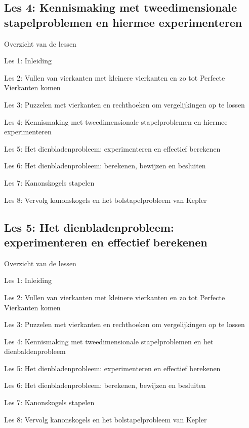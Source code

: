 \documentclass[dutch]{beamer}
\begin{document}
\subsection{Les 4: Kennismaking met tweedimensionale stapelproblemen en hiermee experimenteren}
\begin{frame}
{Overzicht van de lessen}
\begin{list}{\quad}{}
\item Les 1: Inleiding
\item Les 2: Vullen van vierkanten met kleinere vierkanten en zo tot Perfecte Vierkanten komen
\item Les 3: Puzzelen met vierkanten en rechthoeken om vergelijkingen op te lossen
\item {\color{blue}Les 4: Kennismaking met tweedimensionale stapelproblemen en hiermee experimenteren}
\item Les 5: Het dienbladenprobleem: experimenteren en effectief berekenen
\item Les 6: Het dienbladenprobleem: berekenen, bewijzen en besluiten
\item Les 7: Kanonskogels stapelen
\item Les 8: Vervolg kanonskogels en het bolstapelprobleem van Kepler
\end{list}
\end{frame}

\subsection{Les 5: Het dienbladenprobleem: experimenteren en effectief berekenen}
\begin{frame}
{Overzicht van de lessen}
\begin{list}{\quad}{}
\item Les 1: Inleiding
\item Les 2: Vullen van vierkanten met kleinere vierkanten en zo tot Perfecte Vierkanten komen
\item Les 3: Puzzelen met vierkanten en rechthoeken om vergelijkingen op te lossen
\item Les 4: Kennismaking met tweedimensionale stapelproblemen en het dienbaldenprobleem 
\item {\color{blue}Les 5: Het dienbladenprobleem: experimenteren en effectief berekenen}
\item Les 6: Het dienbladenprobleem: berekenen, bewijzen en besluiten
\item Les 7: Kanonskogels stapelen
\item Les 8: Vervolg kanonskogels en het bolstapelprobleem van Kepler
\end{list}
\end{frame}
\end{document}
